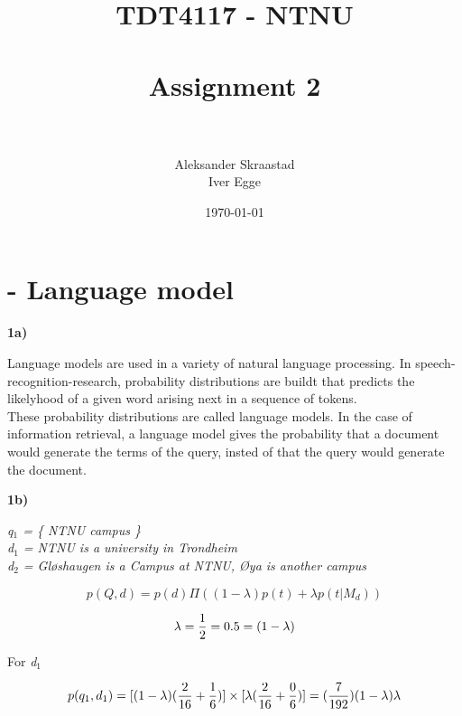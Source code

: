 \documentclass[a4paper, norsk, 11pt]{scrartcl} %
\title{	
\normalfont \normalsize 
\textsc{TDT4117 - NTNU} \\ [25pt] %
\horrule{0.5pt} \\[0.4cm] %
\huge Assignment 2 \\ %
\horrule{2pt} \\[0.5cm] %
}
\author{Aleksander Skraastad\\
		Iver Egge} %
\date{\normalsize\today} %
\numberwithin{equation}{section} %
\numberwithin{figure}{section} %
\numberwithin{table}{section} %
\begin{document}
\maketitle %
\thispagestyle{empty} %


\newpage

\section{- Language model}

\textbf{1a)}

Language models are used in a variety of natural language processing.
In speech-recognition-research, probability distributions are buildt that predicts the likelyhood of a given word arising next in a sequence of tokens.\\
These probability distributions are called language models. In the case of information retrieval, a language model gives the probability that a document would generate the terms of the query, insted of that the query would generate the document.

\vspace{22pt}



\textbf{1b)}

\textit{q$_1$ = \{ NTNU campus \}\\}
\textit{d$_1$ = NTNU is a university in Trondheim\\}
\textit{d$_2$ = Gløshaugen is a Campus at NTNU, Øya is another campus\\}

\begin{equation*}
p(Q, d) = p(d) \Pi ((1-\lambda) p(t) + \lambda p(t | M_d))
\end{equation*}

\begin{equation*}
\lambda = {1 \over 2} = 0.5 = (1 - \lambda)
\end{equation*}

For \textit{d$_1$}

\begin{equation*}
p(q_1, d_1) = [(1 - \lambda)({2 \over 16} + {1 \over 6}) ] \times [\lambda ({2 \over 16} + {0 \over 6}) ] = ({7 \over 192}) (1 - \lambda) \lambda
\end{equation*}
\end{document}

